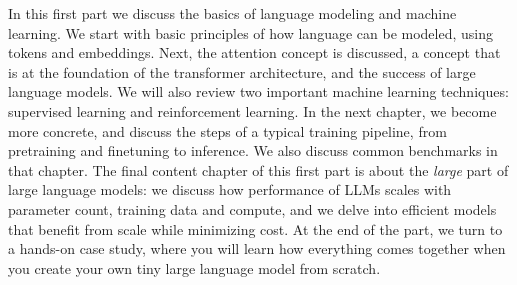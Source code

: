 In this first part we discuss the basics of language modeling and machine learning. We start with basic principles of how language can be modeled, using tokens and embeddings. Next, the attention concept is discussed, a concept that is at the foundation of the transformer architecture, and the success of large language models. We will also review two important machine learning techniques: supervised learning and reinforcement learning. In the next chapter, we become more concrete, and discuss the steps of a typical training pipeline, from pretraining and finetuning to inference. We also discuss common benchmarks in that chapter. The final content chapter of this first part is about the {\em large} part of large language models: we discuss how performance of LLMs scales with parameter count, training data and compute, and we delve into efficient models that benefit from scale while minimizing cost. At the end of the part, we  turn to a hands-on  case study, where you will learn how everything comes together when you create your own tiny large language model from scratch. 
